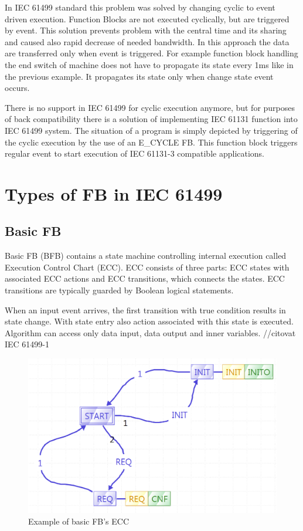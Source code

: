 In IEC 61499 standard this problem was solved by changing cyclic to event driven execution. Function Blocks are not executed cyclically, but are triggered by event. This solution prevents problem with the central time and its sharing and caused also rapid decrease of needed bandwidth. In this approach the data are transferred only when event is triggered. 
For example function block handling the end switch of machine does not have to propagate its state every 1ms like in the previous example. It propagates its state only when change state event occurs. 

There is no support in IEC 61499 for cyclic execution anymore, but for purposes of back compatibility there is a solution of implementing IEC 61131 function into IEC 61499 system. The situation of a program is simply depicted by triggering of the cyclic execution by the use of an E\_CYCLE FB.\cite{4618109} This function block triggers regular event to start execution of IEC 61131-3 compatible applications. 

\section{Types of FB in IEC 61499}

\subsection{Basic FB}
Basic FB (BFB) contains a state machine controlling internal execution called Execution Control Chart (ECC).
ECC consists of three parts: ECC states with associated ECC actions and ECC transitions, which connects the states. ECC transitions are typically guarded by Boolean logical statements. 

When an input event arrives, the first transition with true condition results in state change. With state entry also action associated with this state is executed. Algorithm can access only data input, data output and inner variables. //citovat IEC 61499-1

\begin{figure}[hbp]
\centering
\includegraphics[scale=0.5]{Figures/basicfb-ecc}
\decoRule
\caption[IEC 61499 Basic FB's ECC]{Example of basic FB's ECC}
\label{IEC 61499 Basic FB's ECC}
\end{figure}

